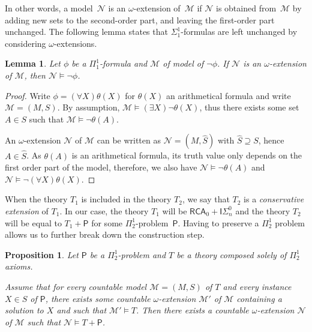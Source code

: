 \documentclass{article}
\def\N{\mathcal{N}}
\def\M{\mathcal{M}}
\def\Psf{\mathsf{P}}
\newcommand{\ISig}{\mathsf{I}\Sigma^0}
\newcommand{\RCA}{\mathsf{RCA}}
\numberwithin{theorem}{section}
\newtheorem{lemma}[theorem]{Lemma}
\newtheorem{proposition}[theorem]{Proposition}
\theoremstyle{definition}
\begin{document}
In other words, a model~$\N$ is an $\omega$-extension of~$\M$ if $\N$ is obtained from~$\M$ by adding new sets to the second-order part, and leaving the first-order part unchanged. The following lemma states that $\Sigma^1_1$-formulas are left unchanged by considering $\omega$-extensions.

\begin{lemma}\label{lem:omega-extension-absolute}
    Let $\phi$ be a $\Pi_1^1$-formula and $\M$ of model of $\neg \phi$. If $\N$ is an $\omega$-extension of $\M$, then $\N \models \neg \phi$.      
\end{lemma}

\begin{proof}
Write $\phi = (\forall X)\theta(X)$ for $\theta(X)$ an arithmetical formula and write $\M = (M,S)$. By assumption, $\M \models (\exists X)\neg \theta(X)$, thus there exists some set $A \in S$ such that $\M \models \neg \theta(A)$.

An $\omega$-extension $\N$ of $\M$ can be written as $\N = (M,\hat S)$ with $\hat S \supseteq S$, hence $A \in \hat S$. As $\theta(A)$ is an arithmetical formula, its truth value only depends on the first order part of the model, therefore, we also have $\N \models \neg \theta(A)$ and $\N \models \neg (\forall X) \theta(X)$.
\end{proof}

When the theory $T_1$ is included in the theory $T_2$, we say that $T_2$ is a \emph{conservative extension} of $T_1$. In our case, the theory $T_1$ will be $\RCA_0 + \ISig_n$ and the theory $T_2$ will be equal to $T_1 + \Psf$ for some $\Pi_2^1$-problem~$\Psf$. Having to preserve a $\Pi_2^1$ problem allows us to further break down the construction step.

\begin{proposition}\label{prop:pi12-problem-conservation}
    Let $\Psf$ be a $\Pi_2^1$-problem and $T$ be a theory composed solely of $\Pi_2^1$ axioms. 
    
    Assume that for every countable model $\M = (M,S)$ of $T$ and every instance $X \in S$ of $\Psf$, there exists some countable $\omega$-extension $\M'$ of $\M$ containing a solution to $X$ and such that $\M' \models T$. Then there exists a countable $\omega$-extension $\N$ of $\M$ such that $\N \models T + \Psf$.
\end{proposition}
\end{document}
